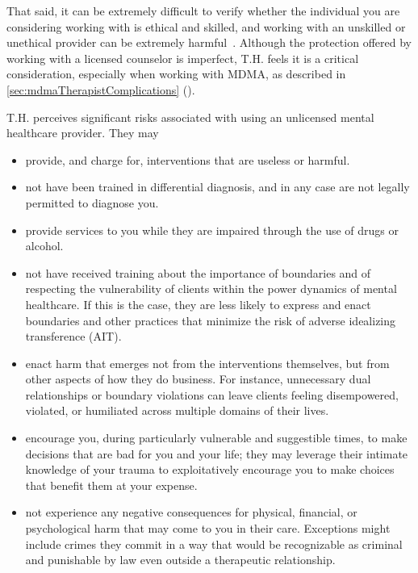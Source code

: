 \documentclass[11pt,oneside]{book}
\let\cite\parencite
\newcommand{\combinedcref}[1]{\cref{#1} (\nameref*{#1})} %
\begin{document}
That said, it can be extremely difficult to verify whether the individual you are considering working with is ethical and skilled, and working with an unskilled or unethical provider can be extremely harmful~\cite{hook2018boundary,therapisttocoach}. Although the protection offered by working with a licensed counselor is imperfect, T.H. feels it is a critical consideration, especially when working with MDMA, as described in \combinedcref{sec:mdmaTherapistComplications}.

T.H. perceives significant risks associated with using an unlicensed mental healthcare provider. They may
\begin{itemize}
    \item provide, and charge for, interventions that are useless or harmful.
    \item not have been trained in differential diagnosis, and in any case are not legally permitted to diagnose you.
    \item provide services to you while they are impaired through the use of drugs or alcohol.
    \item not have received training about the importance of boundaries and of respecting the vulnerability of clients within the power dynamics of mental healthcare. If this is the case, they are less likely to express and enact boundaries and other practices that minimize the risk of adverse idealizing transference (AIT).
    \item enact harm that emerges not from the interventions themselves, but from other aspects of how they do business. For instance, unnecessary dual relationships or boundary violations can leave clients feeling disempowered, violated, or humiliated across multiple domains of their lives.
    \item encourage you, during particularly vulnerable and suggestible times, to make decisions that are bad for you and your life; they may leverage their intimate knowledge of your trauma to exploitatively encourage you to make choices that benefit them at your expense.
    \item not experience any negative consequences for physical, financial, or psychological harm that may come to you in their care. Exceptions might include crimes they commit in a way that would be recognizable as criminal and punishable by law even outside a therapeutic relationship.
\end{itemize}
\end{document}
